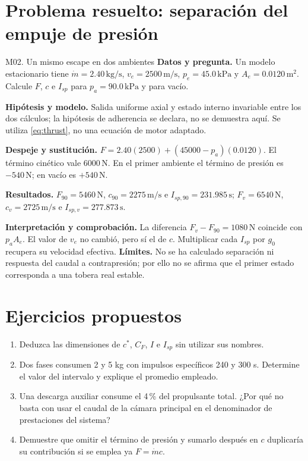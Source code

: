 \section{Problema resuelto: separación del empuje de presión}
\begin{studiumworked}{M02. Un mismo escape en dos ambientes}
\textbf{Datos y pregunta.} Un modelo estacionario tiene $\dot m=2.40\,\mathrm{kg/s}$, $v_e=2500\,\mathrm{m/s}$, $p_e=45.0\,\mathrm{kPa}$ y $A_e=0.0120\,\mathrm{m^2}$. Calcule $F$, $c$ e $I_{sp}$ para $p_a=90.0\,\mathrm{kPa}$ y para vacío.

\textbf{Hipótesis y modelo.} Salida uniforme axial y estado interno invariable entre los dos cálculos; la hipótesis de adherencia se declara, no se demuestra aquí. Se utiliza \eqref{eq:thrust}, no una ecuación de motor adaptado.

\textbf{Despeje y sustitución.} $F=2.40(2500)+(45000-p_a)(0.0120)$. El término cinético vale $6000\,\mathrm N$. En el primer ambiente el término de presión es $-540\,\mathrm N$; en vacío es $+540\,\mathrm N$.

\textbf{Resultados.} $F_{90}=5460\,\mathrm N$, $c_{90}=2275\,\mathrm{m/s}$ e $I_{sp,90}=231.985\,\mathrm s$; $F_v=6540\,\mathrm N$, $c_v=2725\,\mathrm{m/s}$ e $I_{sp,v}=277.873\,\mathrm s$.

\textbf{Interpretación y comprobación.} La diferencia $F_v-F_{90}=1080\,\mathrm N$ coincide con $p_aA_e$. El valor de $v_e$ no cambió, pero sí el de $c$. Multiplicar cada $I_{sp}$ por $g_0$ recupera su velocidad efectiva. \textbf{Límites.} No se ha calculado separación ni respuesta del caudal a contrapresión; por ello no se afirma que el primer estado corresponda a una tobera real estable.

\end{studiumworked}
\section{Ejercicios propuestos}
\begin{enumerate}
\item Deduzca las dimensiones de $c^*$, $C_F$, $I$ e $I_{sp}$ sin utilizar sus nombres.
\item Dos fases consumen 2 y 5 kg con impulsos específicos 240 y 300 s. Determine el valor del intervalo y explique el promedio empleado.
\item Una descarga auxiliar consume el 4\,\% del propulsante total. ¿Por qué no basta con usar el caudal de la cámara principal en el denominador de prestaciones del sistema?
\item Demuestre que omitir el término de presión y sumarlo después en $c$ duplicaría su contribución si se emplea ya $F=\dot m c$.
\end{enumerate}


\studiumchaptercheck
